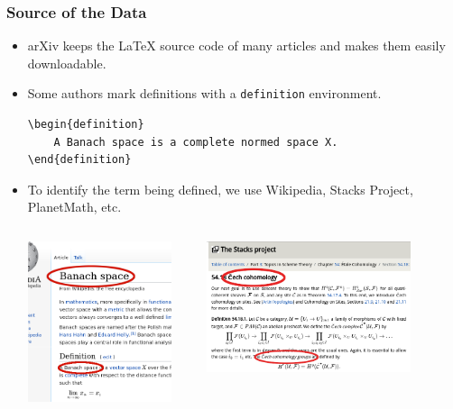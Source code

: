 \documentclass[10pt]{beamer}
\begin{document}
\begin{frame}[fragile]
    \frametitle{Source of the Data}
    \begin{itemize}
        \item arXiv keeps the \LaTeX{} source code of many articles and makes them easily downloadable.
            \pause
        \item Some authors mark definitions with a \texttt{definition} environment.
            \begin{verbatim}
\begin{definition}
    A Banach space is a complete normed space X.  
\end{definition}
    \end{verbatim}
    \pause
\item To identify the term being defined, we use Wikipedia, Stacks Project, PlanetMath, etc.
    \begin{columns}
        \begin{column}{0.4\textwidth}
            \includegraphics[width=0.9\textwidth]{../Images/wiki_thin_banach.png}
        \end{column}
        \pause
        \begin{column}{0.6\textwidth}
            \includegraphics[width=0.8\textwidth]{../Images/stacks_defs.png}

\end{column}
\end{columns}
\end{itemize}
\end{frame}
\end{document}
